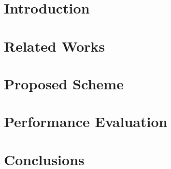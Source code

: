 

\chapter{Introduction} \label{ch:1-introduction}
	

\chapter{Related Works} \label{ch:2-background}
	

\chapter{Proposed Scheme} \label{ch:3-proposed}
	
	
\chapter{Performance Evaluation} \label{ch:4-simulation}
	
	
\chapter{Conclusions} \label{ch:5-conclusion}
	

